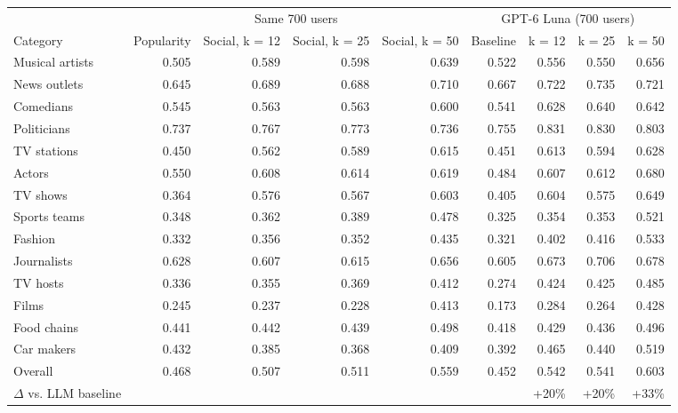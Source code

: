 \begin{tabular}{lrrrrrrrr}
\toprule
 & \multicolumn{4}{c}{Same 700 users} & \multicolumn{4}{c}{GPT-6 Luna (700 users)} \\
Category & Popularity & Social, k = 12 & Social, k = 25 & Social, k = 50 & Baseline & k = 12 & k = 25 & k = 50 \\
\midrule
Musical artists & 0.505 & 0.589 & 0.598 & 0.639 & 0.522 & 0.556 & 0.550 & 0.656 \\
News outlets & 0.645 & 0.689 & 0.688 & 0.710 & 0.667 & 0.722 & 0.735 & 0.721 \\
Comedians & 0.545 & 0.563 & 0.563 & 0.600 & 0.541 & 0.628 & 0.640 & 0.642 \\
Politicians & 0.737 & 0.767 & 0.773 & 0.736 & 0.755 & 0.831 & 0.830 & 0.803 \\
TV stations & 0.450 & 0.562 & 0.589 & 0.615 & 0.451 & 0.613 & 0.594 & 0.628 \\
Actors & 0.550 & 0.608 & 0.614 & 0.619 & 0.484 & 0.607 & 0.612 & 0.680 \\
TV shows & 0.364 & 0.576 & 0.567 & 0.603 & 0.405 & 0.604 & 0.575 & 0.649 \\
Sports teams & 0.348 & 0.362 & 0.389 & 0.478 & 0.325 & 0.354 & 0.353 & 0.521 \\
Fashion & 0.332 & 0.356 & 0.352 & 0.435 & 0.321 & 0.402 & 0.416 & 0.533 \\
Journalists & 0.628 & 0.607 & 0.615 & 0.656 & 0.605 & 0.673 & 0.706 & 0.678 \\
TV hosts & 0.336 & 0.355 & 0.369 & 0.412 & 0.274 & 0.424 & 0.425 & 0.485 \\
Films & 0.245 & 0.237 & 0.228 & 0.413 & 0.173 & 0.284 & 0.264 & 0.428 \\
Food chains & 0.441 & 0.442 & 0.439 & 0.498 & 0.418 & 0.429 & 0.436 & 0.496 \\
Car makers & 0.432 & 0.385 & 0.368 & 0.409 & 0.392 & 0.465 & 0.440 & 0.519 \\
\midrule
Overall & 0.468 & 0.507 & 0.511 & 0.559 & 0.452 & 0.542 & 0.541 & 0.603 \\
$\Delta$ vs. LLM baseline &  &  &  &  &  & +20\% & +20\% & +33\% \\
\bottomrule
\end{tabular}
